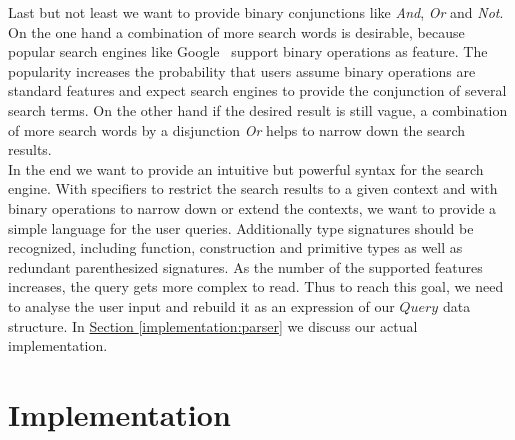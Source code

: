 \documentclass[%
	pdftex,%
	a4paper,%
	oneside,%
	chapterprefix,%
	headsepline,%
	12pt%
]{scrbook}
\newcommand{\Conid}[1]{\mathit{#1}}
\begin{document}
Last but not least we want to provide binary conjunctions like
\emph{And}, \emph{Or} and \emph{Not}. %
On the one hand a combination of more search words is desirable,
because popular search engines like Google\texttrademark~ support
binary operations as feature. %
The popularity increases the probability that users assume binary
operations are standard features and expect search engines to provide
the conjunction of several search terms. %
On the other hand if the desired result is still vague, a combination
of more search words by a disjunction \emph{Or} helps to narrow down
the search results.\\

In the end we want to provide an intuitive but powerful syntax for the
search engine. %
With specifiers to restrict the search results to a given context and
with binary operations to narrow down or extend the contexts, we want
to provide a simple language for the user queries. %
Additionally type signatures should be recognized, including function,
construction and primitive types as well as redundant parenthesized
signatures. %
As the number of the supported features increases, the query gets more
complex to read. %
Thus to reach this goal, we need to analyse the user input and rebuild
it as an expression of our \ensuremath{\Conid{Query}} data structure. %
In \hyperref[implementation:parser]{Section
  \ref{implementation:parser}} we discuss our actual implementation. %

\chapter{Implementation}\label{implementation}
\end{document}
